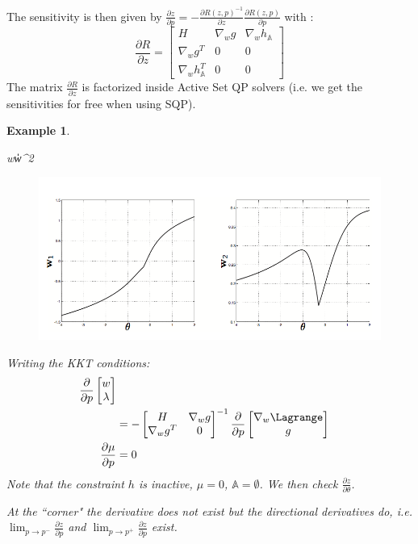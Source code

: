 \documentclass{article}
\theoremstyle{example}
\newtheorem{exmp}{Example}[section]
\theoremstyle{definition}
\theoremstyle{assumption}
\theoremstyle{lemma}
\begin{document}
	The sensitivity is then given by $\frac{\partial z}{\partial p}=-\frac{\partial R(z,p)^{-1}}{\partial z}\frac{\partial R(z,p)}{\partial p}$ with :
	\begin{equation*}
		\frac{\partial R}{\partial z}=
		\begin{bmatrix}
			H & \nabla_wg & \nabla_wh_\mathbb{A}\\
			\nabla_wg^T & 0 & 0\\
			\nabla_wh_\mathbb{A}^T & 0 & 0
		\end{bmatrix}
	\end{equation*}
	The matrix $\frac{\partial R}{\partial z}$ is factorized inside Active Set QP solvers (i.e. we get the sensitivities for free when using SQP).
	\begin{exmp}
		\begin{mini!}
			{w}{\|w\|^2}{}{}
		\end{mini!}
		\begin{figure}[H]
			\centering
			\includegraphics{NLP_example}
			\caption{}
		\end{figure}
		Writing the KKT conditions:
		\begin{align*}
			\frac{\partial}{\partial p}
			\begin{bmatrix}
				w\\ \lambda
			\end{bmatrix}\\
			&=-
			\begin{bmatrix}
				H & \nabla_wg\\
				\nabla_wg^T & 0
			\end{bmatrix}^{-1}
			\frac{\partial}{\partial p}
			\begin{bmatrix}
				\nabla_w\Lagrange\\
				g
			\end{bmatrix}\\
			\frac{\partial\mu}{\partial p}&=0
		\end{align*}
		Note that the constraint $h$ is inactive, $\mu=0$, $\mathbb{A}=\emptyset$.
		We then check $\frac{\partial z}{\partial \theta}$.
		\par
		At the ``corner" the derivative does not exist but the directional derivatives do, i.e. $\lim_{p\rightarrow p^-}\frac{\partial z}{\partial p}$ and $\lim_{p\rightarrow p^+}\frac{\partial z}{\partial p}$ exist.	
	\end{exmp}
\end{document}
